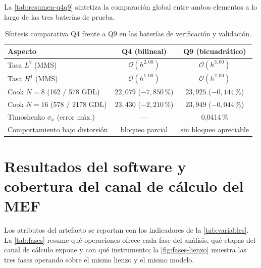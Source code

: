 La \autoref{tab:resumen-q4q9} sintetiza la comparación global entre ambos elementos a lo largo de las tres baterías de prueba.

\begin{table}[htbp]
\centering
\caption{Síntesis comparativa Q4 frente a Q9 en las baterías de verificación y validación.}
\label{tab:resumen-q4q9}
\begin{tabular}{l c c}
\hline
Aspecto & Q4 (bilineal) & Q9 (bicuadrático) \\
\hline
Tasa $L^2$ (MMS)              & $\mathcal{O}(h^{2{,}00})$ & $\mathcal{O}(h^{3{,}00})$ \\
Tasa $H^1$ (MMS)              & $\mathcal{O}(h^{1{,}00})$ & $\mathcal{O}(h^{2{,}00})$ \\
Cook $N=8$ (162 / 578 GDL)    & $22{,}079$ ($-7{,}850\,\%$) & $23{,}925$ ($-0{,}144\,\%$) \\
Cook $N=16$ (578 / 2178 GDL)  & $23{,}430$ ($-2{,}210\,\%$) & $23{,}949$ ($-0{,}044\,\%$) \\
Timoshenko $\sigma_x$ (error máx.) & --- & 0,0414\,\% \\
Comportamiento bajo distorsión & bloqueo parcial & sin bloqueo apreciable \\
\hline
\end{tabular}
{\singlespacing{}}
\end{table}

\section{Resultados del software y cobertura del canal de cálculo del MEF}
\label{sec:cobertura}

Los atributos del artefacto se reportan con los indicadores de la \autoref{tab:variables}. La \autoref{tab:fases} resume qué operaciones ofrece cada fase del análisis, qué etapas del canal de cálculo expone y con qué instrumento; la \autoref{fig:fases-lienzo} muestra las tres fases operando sobre el mismo lienzo y el mismo modelo.

